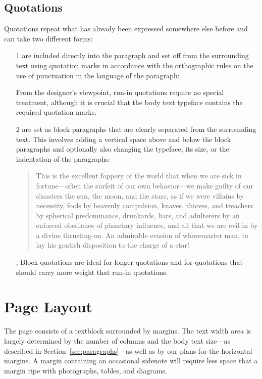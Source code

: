 \subsection{Quotations}
Quotations repeat what has already been expressed somewhere else before and can
take two different forms:~\cite[sec.\,5.4]{bringhurst92}
\begin{enumerate}
  \item[1]
    are included directly into the paragraph and set off from the surrounding
    text using quotation marks in accordance with the orthographic rules on the
    use of punctuation in the language of the paragraph: 
    
    From the designer's viewpoint, run-in quotations require no special
    treatment, although it is crucial that the body text typeface contains the
    required quotation marks.
  \item[2]
    are set as block paragraphs that are clearly
    separated from the surrounding text. This involves adding a vertical space
    above and below the block paragraphs and optionally also changing the
    typeface, its size, or the indentation of the
    paragraphs:~\cite[sec.\,2.3.3]{bringhurst92}\blockquote{%
      This is the excellent foppery of the world that when we are sick in
      fortune—often the surfeit of our own behavior—we make guilty of our
      disasters the sun, the moon, and the stars, as if we were villains by
      necessity, fools by heavenly compulsion, knaves, thieves, and treachers by
      spherical predominance, drunkards, liars, and adulterers by an enforced
      obedience of planetary influence, and all that we are evil in by a divine
      thrusting-on. An admirable evasion of whoremaster man, to lay his goatish
      disposition to the charge of a star!}{,
      }
    Block quotations are ideal for longer quotations and for quotations that
    should carry more weight that run-in quotations.
\end{enumerate}

\section{Page Layout}
The page consists of a textblock surrounded by margins. The text width
area is largely determined by the number of columns and the body text size---as
described in Section~\ref{sec:paragraphs}---as well as by our plans for the
horizontal margins. A margin containing an occasional sidenote will require less
space that a margin ripe with photographs, tables, and diagrams.

